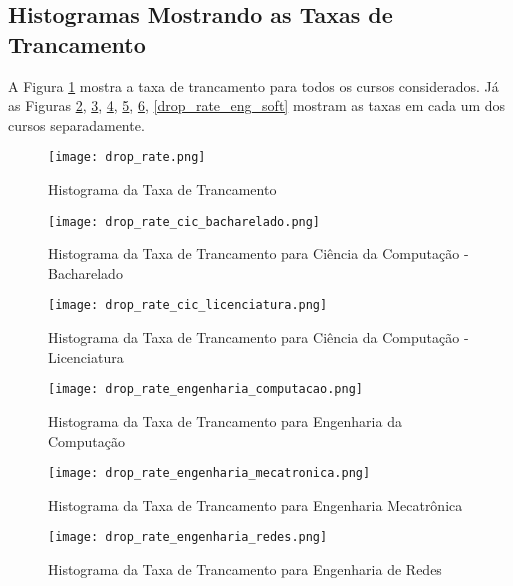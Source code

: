 \clearpage

\subsection{Histogramas Mostrando as Taxas de Trancamento}
A Figura \ref{drop_rate_all} mostra a taxa de trancamento para todos os cursos
considerados. 
Já as Figuras \ref{drop_rate_cic_b}, \ref{drop_rate_cic_lic},
\ref{drop_rate_eng_comp}, \ref{drop_rate_eng_mectr}, \ref{drop_rate_eng_redes},
\ref{drop_rate_eng_soft} mostram as taxas em cada um dos cursos separadamente. 

\begin{figure}[!ht]
    \caption{Histograma da Taxa de Trancamento}
    \centering
    \texttt{[image: drop\_rate.png]}
    \label{drop_rate_all}
\end{figure}

\begin{figure}[!ht]
    \caption{Histograma da Taxa de Trancamento para Ciência da Computação - Bacharelado}
    \centering
    \texttt{[image: drop\_rate\_cic\_bacharelado.png]}
    \label{drop_rate_cic_b}
\end{figure}

\begin{figure}[!ht]
    \caption{Histograma da Taxa de Trancamento para Ciência da Computação -
    Licenciatura}
    \centering
    \texttt{[image: drop\_rate\_cic\_licenciatura.png]}
    \label{drop_rate_cic_lic}
\end{figure}

\begin{figure}[!ht]
    \caption{Histograma da Taxa de Trancamento para Engenharia da Computação}
    \centering
    \texttt{[image: drop\_rate\_engenharia\_computacao.png]}
    \label{drop_rate_eng_comp}
\end{figure}

\begin{figure}[!ht]
    \caption{Histograma da Taxa de Trancamento para Engenharia Mecatrônica}
    \centering
    \texttt{[image: drop\_rate\_engenharia\_mecatronica.png]}
    \label{drop_rate_eng_mectr}
\end{figure}

\begin{figure}[!ht]
    \caption{Histograma da Taxa de Trancamento para Engenharia de Redes}
    \centering
    \texttt{[image: drop\_rate\_engenharia\_redes.png]}
    \label{drop_rate_eng_redes}
\end{figure}


